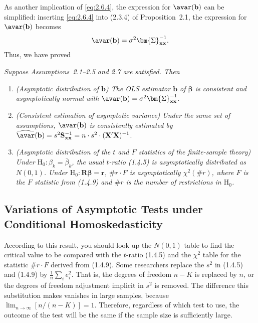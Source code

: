 As another implication of \eqref{eq:2.6.4}, the expression for $\avar(\mathbf{b})$ can
be simplified: inserting \eqref{eq:2.6.4} into (2.3.4) of Proposition~2.1, the expression
for $\avar(\mathbf{b})$ becomes
\begin{equation}
  \avar(\mathbf{b}) = \sigma^2 \bm{\Sigma}_{\mathbf{xx}}^{-1}.
  \label{eq:2.6.5}
\end{equation}
Thus, we have proved

\begin{proposition}
\label{prop:2.5}
\emph{Suppose Assumptions~2.1--2.5 and 2.7 are satisfied.  Then}
\begin{enumerate}[label=(\alph*)]
  \item \emph{(Asymptotic distribution of $\mathbf{b}$) \; The OLS estimator
    $\mathbf{b}$ of $\bm{\beta}$ is consistent and asymptotically normal with}
    $\avar(\mathbf{b}) = \sigma^2 \bm{\Sigma}_{\mathbf{xx}}^{-1}$.

  \item \emph{(Consistent estimation of asymptotic variance) \; Under the same set of
    assumptions, $\avar(\mathbf{b})$ is consistently estimated by}
    $\widehat{\avar}(\mathbf{b}) = s^2 \mathbf{S}_{\mathbf{xx}}^{-1}
    = n \cdot s^2 \cdot (\mathbf{X}'\mathbf{X})^{-1}$.

  \item \emph{(Asymptotic distribution of the $t$ and $F$ statistics of the
    finite-sample theory) \; Under $\mathrm{H}_0\colon \beta_k = \bar{\beta}_k$, the
    usual $t$-ratio (1.4.5) is asymptotically distributed as $N(0,1)$.  Under
    $\mathrm{H}_0\colon \mathbf{R}\bm{\beta} = \mathbf{r}$,
    $\#r \cdot F$ is asymptotically $\chi^2(\#r)$, where $F$ is the $F$ statistic from
    (1.4.9) and $\#r$ is the number of restrictions in $\mathrm{H}_0$.}
\end{enumerate}
\end{proposition}

\subsection*{Variations of Asymptotic Tests under Conditional Homoskedasticity}

According to this result, you should look up the $N(0,1)$ table to find the critical
value to be compared with the $t$-ratio (1.4.5) and the $\chi^2$ table for the statistic
$\#r \cdot F$ derived from (1.4.9).  Some researchers replace the $s^2$ in (1.4.5) and
(1.4.9) by $\frac{1}{n} \sum_i e_i^2$.  That is, the degrees of freedom $n - K$ is
replaced by $n$, or the degrees of freedom adjustment implicit in $s^2$ is removed.
The difference this substitution makes vanishes in large samples, because
$\lim_{n \to \infty} [n/(n - K)] = 1$.  Therefore, regardless of which test to use, the
outcome of the test will be the same if the sample size is sufficiently large.

